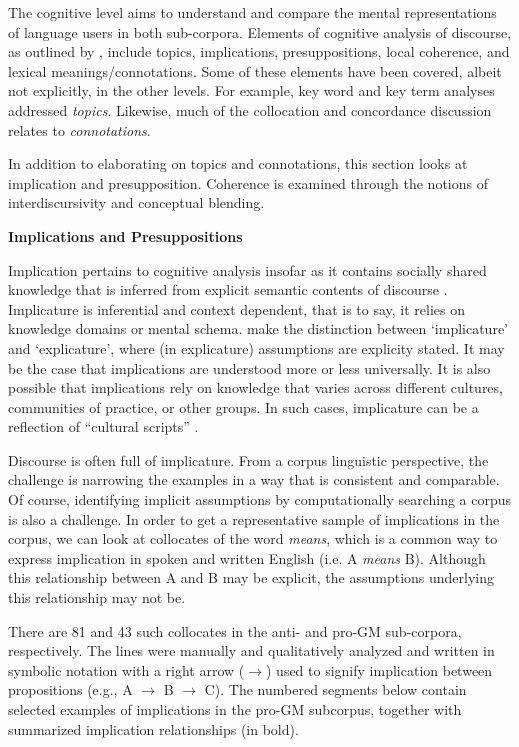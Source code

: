The cognitive level aims to understand and compare the mental representations of language users in both sub-corpora. Elements of cognitive analysis of discourse, as outlined by \cite{VanDijk2000a}, include topics, implications, presuppositions, local coherence, and lexical meanings/connotations. Some of these elements have been covered, albeit not explicitly, in the other levels. For example, key word and key term analyses addressed \textit{topics}. Likewise, much of the collocation and concordance discussion relates to \textit{connotations}. 

In addition to elaborating on topics and connotations, this section looks at implication and presupposition. Coherence is examined through the notions of interdiscursivity and conceptual blending. 

\textbf{Implications and Presuppositions}

Implication pertains to cognitive analysis insofar as it contains socially shared knowledge that is inferred from explicit semantic contents of discourse \citep{VanDijk2000a}. Implicature \citep{Grice1975} is inferential and context dependent, that is to say, it relies on knowledge domains or mental schema. \cite{Sperber1995} make the distinction between `implicature' and `explicature', where (in explicature) assumptions are explicity stated. It may be the case that implications are understood more or less universally. It is also possible that implications rely on knowledge that varies across different cultures, communities of practice, or other groups. In such cases, implicature can be a reflection of ``cultural scripts'' \citep{Wierzbicka1985, Wierzbicka2003}.

Discourse is often full of implicature. From a corpus linguistic perspective, the challenge is narrowing the examples in a way that is consistent and comparable. Of course, identifying implicit assumptions by computationally searching a corpus is also a challenge.  In order to get a representative sample of implications in the corpus, we can look at collocates of the word \textit{means}, which is a common way to express implication in spoken and written English (i.e. A \textit{means} B). Although this relationship between A and B may be explicit, the assumptions underlying this relationship may not be.   

There are 81 and 43 such collocates in the anti- and pro-GM sub-corpora, respectively. The lines were manually and qualitatively analyzed and written in symbolic notation with a right arrow ($\rightarrow$) used to signify implication between propositions (e.g., A $\rightarrow$ B $\rightarrow$ C). The numbered segments below contain selected examples of implications in the pro-GM subcorpus, together with summarized implication relationships (in bold).

